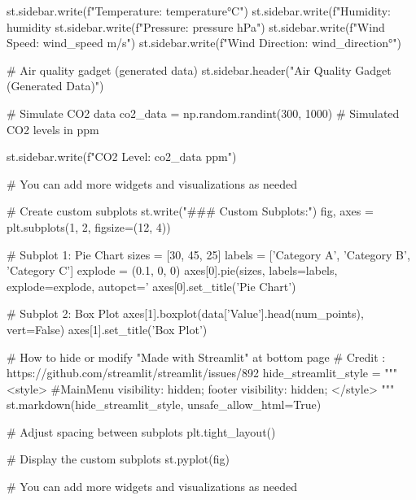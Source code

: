st.sidebar.write(f"Temperature: {temperature}°C")
st.sidebar.write(f"Humidity: {humidity}%
st.sidebar.write(f"Pressure: {pressure} hPa")
st.sidebar.write(f"Wind Speed: {wind_speed} m/s")
st.sidebar.write(f"Wind Direction: {wind_direction}°")

# Air quality gadget (generated data)
st.sidebar.header("Air Quality Gadget (Generated Data)")

# Simulate CO2 data
co2_data = np.random.randint(300, 1000)  # Simulated CO2 levels in ppm

st.sidebar.write(f"CO2 Level: {co2_data} ppm")

# You can add more widgets and visualizations as needed














# Create custom subplots
st.write("### Custom Subplots:")
fig, axes = plt.subplots(1, 2, figsize=(12, 4))

# Subplot 1: Pie Chart
sizes = [30, 45, 25]
labels = ['Category A', 'Category B', 'Category C']
explode = (0.1, 0, 0)
axes[0].pie(sizes, labels=labels, explode=explode, autopct='%
axes[0].set_title('Pie Chart')

# Subplot 2: Box Plot
axes[1].boxplot(data['Value'].head(num_points), vert=False)
axes[1].set_title('Box Plot')



# How to hide or modify "Made with Streamlit" at bottom page
# Credit : https://github.com/streamlit/streamlit/issues/892
hide_streamlit_style = """
            <style>
            #MainMenu {visibility: hidden;}
            footer {visibility: hidden;}
            </style>
            """
st.markdown(hide_streamlit_style, unsafe_allow_html=True) 


# Adjust spacing between subplots
plt.tight_layout()

# Display the custom subplots
st.pyplot(fig)

# You can add more widgets and visualizations as needed



















